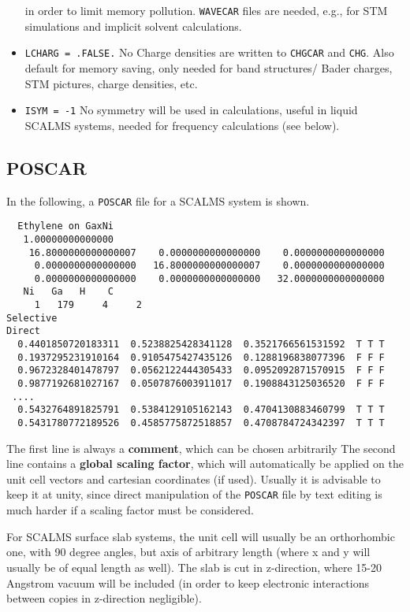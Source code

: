 \documentclass[a4paper,11pt]{article}
\begin{document}
\begin{itemize}
in order to limit memory pollution. \texttt{WAVECAR} files are needed, e.g.,  for STM simulations and implicit solvent calculations.
\item \texttt{LCHARG = .FALSE.}  No Charge densities are written to \texttt{CHGCAR} and \texttt{CHG}. Also 
default for memory saving, only needed for band structures/ Bader charges, STM pictures, charge
densities, etc.
\item \texttt{ISYM = -1}  No symmetry will be used in calculations, useful in liquid SCALMS systems,
needed for frequency calculations (see below).
\end{itemize}


\subsection{POSCAR}


In the following, a \texttt{POSCAR} file for a SCALMS system is shown.

  \begin{verbatim}
  Ethylene on GaxNi
   1.00000000000000
    16.8000000000000007    0.0000000000000000    0.0000000000000000
     0.0000000000000000   16.8000000000000007    0.0000000000000000
     0.0000000000000000    0.0000000000000000   32.0000000000000000
   Ni   Ga   H    C
     1   179     4     2
Selective
Direct
  0.4401850720183311  0.5238825428341128  0.3521766561531592  T T T
  0.1937295231910164  0.9105475427435126  0.1288196838077396  F F F
  0.9672328401478797  0.0562122444305433  0.0952092871570915  F F F
  0.9877192681027167  0.0507876003911017  0.1908843125036520  F F F
 ....
  0.5432764891825791  0.5384129105162143  0.4704130883460799  T T T
  0.5431780772189526  0.4585775872518857  0.4708784724342397  T T T
  \end{verbatim}
  
The first line is always a \textbf{comment}, which can be chosen arbitrarily
The second line contains a \textbf{global scaling factor}, which will automatically
be applied on the unit cell vectors and cartesian coordinates (if used).
Usually it is advisable to keep it at unity, since direct manipulation
of the \texttt{POSCAR} file by text editing is much harder if a scaling
factor must be considered.

For SCALMS surface slab systems, the unit cell will usually be an orthorhombic one,
with 90 degree angles,
but axis of arbitrary length (where x and y will usually be of equal length 
as well). The slab is cut in z-direction, where 15-20 Angstrom vacuum will be 
included (in order to keep electronic interactions between copies in z-direction
negligible).
\end{document}
